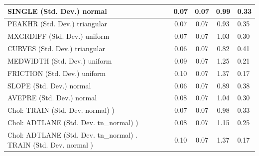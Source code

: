 \begin{table}
\begin{center}
\begin{tabular}{|l|l|c|c|c|l|}
			\hline
			SINGLE (Std. Dev.) normal &  & 0.07 & 0.07 & 0.99 & 0.33 \\
			\hline
			PEAKHR (Std. Dev.) triangular &  & 0.07 & 0.07 & 0.93 & 0.35 \\
			\hline
			MXGRDIFF (Std. Dev.) uniform &  & 0.07 & 0.07 & 1.03 & 0.30 \\
			\hline
			CURVES (Std. Dev.) triangular &  & 0.06 & 0.07 & 0.82 & 0.41 \\
			\hline
			MEDWIDTH (Std. Dev.) uniform &  & 0.09 & 0.07 & 1.25 & 0.21 \\
			\hline
			FRICTION (Std. Dev.) uniform &  & 0.10 & 0.07 & 1.37 & 0.17 \\
			\hline
			SLOPE (Std. Dev.) normal &  & 0.06 & 0.07 & 0.89 & 0.38 \\
			\hline
			AVEPRE (Std. Dev.) normal &  & 0.08 & 0.07 & 1.04 & 0.30 \\
			\hline
			 Chol: TRAIN (Std. Dev. normal) ) &  & 0.07 & 0.07 & 0.98 & 0.33 \\
			\hline
			 Chol: ADTLANE (Std. Dev. tn_normal) ) &  & 0.08 & 0.07 & 1.15 & 0.25 \\
			\hline
			 Chol: ADTLANE (Std. Dev. tn_normal) . TRAIN (Std. Dev.   normal ) &  & 0.10 & 0.07 & 1.37 & 0.17 \\
			\hline
		\end{tabular}
	\end{center}
\end{table}